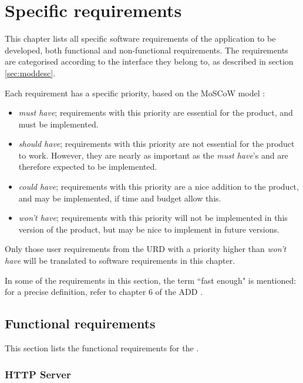 \chapter{Specific requirements}
\label{chap:specreq}
This chapter lists all specific software requirements of the application to be developed, both functional and non-functional requirements. The requirements are categorised according to the interface they belong to, as described in section \ref{sec:moddesc}.

Each requirement has a specific priority, based on the MoSCoW model \cite{moscow}:

\begin{itemize}
    \item \emph{must have}; requirements with this priority are essential for the product, and must be implemented.
    \item \emph{should have}; requirements with this priority are not essential for the product to work. However, they are nearly as important as the \emph{must have}'s and are therefore expected to be implemented.
    \item \emph{could have}; requirements with this priority are a nice addition to the product, and may be implemented, if time and budget allow this.
    \item \emph{won't have}; requirements with this priority will not be implemented in this version of the product, but may be nice to implement in future versions.
\end{itemize}

\noindent Only those user requirements from the URD \cite{urd} with a priority higher than \emph{won't have} will be translated to software requirements in this chapter.

\fpstartparagraph{} In some of the requirements in this section, the term ``fast enough" is mentioned: for a precise definition, refer to chapter 6 of the ADD \cite{add}.

\section{Functional requirements}
\label{sec:funcreq}
This section lists the functional requirements for the \applicationname.

\subsection{HTTP Server}

